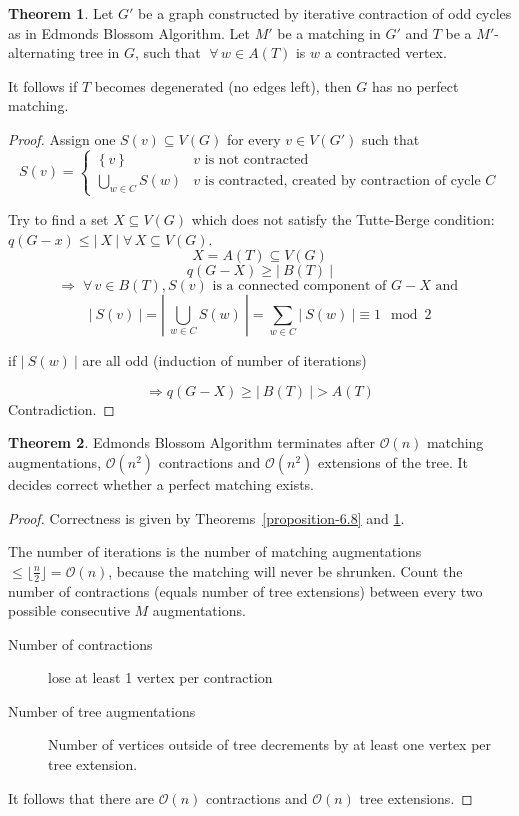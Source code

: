 \documentclass[a4paper]{article}
\theoremstyle{definition}
\newtheorem{theorem}{Theorem}
\newcommand{\card}[1]{\left|\:\!#1\:\!\right|}
\newcommand{\set}[1]{\left\{#1\right\}}
\newcommand{\fall}{\;\forall\,}
\begin{document}
\begin{theorem}\label{proposition-6.9}
  Let $G'$ be a graph constructed by iterative contraction of odd cycles as in Edmonds Blossom Algorithm. Let $M'$ be a matching in $G'$ and $T$ be a $M'$-alternating tree in $G$, such that $\fall w \in A(T)$ is $w$ a contracted vertex.

  It follows if $T$ becomes degenerated (no edges left), then $G$ has no perfect matching.
\end{theorem}

\begin{proof}
  Assign one $S(v) \subseteq V(G)$ for every $v \in V(G')$ such that
  \[
    S(v) = \begin{cases}
      \set{v}                 & v \text{ is not contracted} \\
      \bigcup_{w \in C} S(w)  & v \text{ is contracted, created by contraction of cycle $C$}
    \end{cases}
  \]

  Try to find a set $X \subseteq V(G)$ which does not satisfy the Tutte-Berge condition:
  $q (G-x) \leq \card{X} \fall X \subseteq V(G)$.
  \[
    X = A(T) \subseteq V(G)
  \] \[
    q(G-X) \geq \card{B(T)}
  \] \[
    \Rightarrow
      \fall v \in B(T),
        S(v) \text{ is a connected component of $G-X$ and
        }
  \] \[
    \card{S(v)} = \card{\bigcup_{w \in C} S(w)}
        = \sum_{w \in C} \card{S(w)}
        \equiv 1 \mod{2}
  \]
  \begin{center}
    if $\card{S(w)}$ are all odd (induction of number of iterations)
  \end{center}
  \[
    \Rightarrow q(G-X) \geq \card{B(T)} > A(T)
  \]
  Contradiction.
\end{proof}

\begin{theorem}\label{satz-6.10}
  Edmonds Blossom Algorithm terminates after $\mathcal{O}(n)$ matching augmentations,
  $\mathcal{O}(n^2)$ contractions and $\mathcal{O}(n^2)$ extensions of the tree.
  It decides correct whether a perfect matching exists.
\end{theorem}

\begin{proof}
  Correctness is given by Theorems~\ref{proposition-6.8} and \ref{proposition-6.9}.

  The number of iterations is the number of matching augmentations $\leq \lfloor \frac{n}2 \rfloor = \mathcal{O}(n)$, because the matching will never be shrunken.
  Count the number of contractions (equals number of tree extensions) between every two possible consecutive $M$ augmentations.

  \begin{description}
    \item[Number of contractions] lose at least 1 vertex per contraction
    \item[Number of tree augmentations]
      Number of vertices outside of tree decrements by at least one vertex per tree extension.
  \end{description}

  It follows that there are $\mathcal{O}(n)$ contractions and $\mathcal{O}(n)$ tree extensions.
\end{proof}
\end{document}
